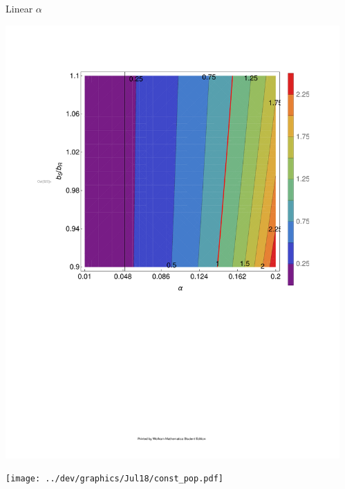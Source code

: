 \documentclass[final]{beamer}
\newlength{\sepwid}
\newlength{\onecolwid}
\begin{document}
\begin{frame}[t]
\begin{block}

\begin{columns}[t] %
\begin{column}{\sepwid}\end{column} %

\begin{column}{\onecolwid}
  \begin{alertblock}{Linear $\alpha$}
  \begin{center}
    \includegraphics[width=\columnwidth]{../dev/graphics/Jul14/const_alpha_contour.pdf}

    \texttt{[image: ../dev/graphics/Jul18/const\_pop.pdf]}
  \end{center}
  \end{alertblock}
\end{column}


\end{columns}
\end{block}
\end{frame}
\end{document}
